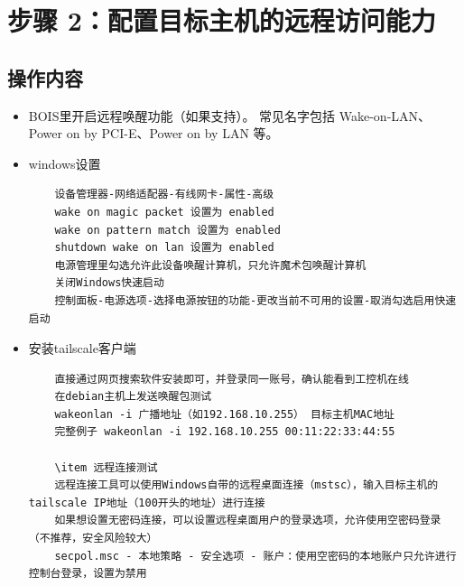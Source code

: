 \documentclass[12pt,a4paper]{ctexart}
\begin{document}
\section{步骤 2：配置目标主机的远程访问能力}

\subsection{操作内容}
\begin{itemize}[leftmargin=2em]
    \item BOIS里开启远程唤醒功能（如果支持）。
    常见名字包括 Wake-on-LAN、Power on by PCI-E、Power on by LAN 等。
    \item windows设置
    \begin{verbatim}
    设备管理器-网络适配器-有线网卡-属性-高级
    wake on magic packet 设置为 enabled
    wake on pattern match 设置为 enabled
    shutdown wake on lan 设置为 enabled
    电源管理里勾选允许此设备唤醒计算机，只允许魔术包唤醒计算机
    关闭Windows快速启动
    控制面板-电源选项-选择电源按钮的功能-更改当前不可用的设置-取消勾选启用快速启动

    \end{verbatim}
    \item 安装tailscale客户端   
    \begin{verbatim}
    直接通过网页搜索软件安装即可，并登录同一账号，确认能看到工控机在线
    在debian主机上发送唤醒包测试
    wakeonlan -i 广播地址（如192.168.10.255） 目标主机MAC地址
    完整例子 wakeonlan -i 192.168.10.255 00:11:22:33:44:55
    
    \item 远程连接测试
    远程连接工具可以使用Windows自带的远程桌面连接（mstsc），输入目标主机的tailscale IP地址（100开头的地址）进行连接
    如果想设置无密码连接，可以设置远程桌面用户的登录选项，允许使用空密码登录（不推荐，安全风险较大）
    secpol.msc - 本地策略 - 安全选项 - 账户：使用空密码的本地账户只允许进行控制台登录，设置为禁用
    \end{verbatim}
\end{itemize}
\end{document}
